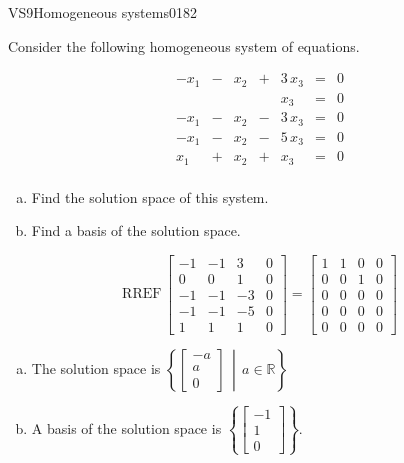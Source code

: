 \begin{exercise}{VS9}{Homogeneous systems}{0182} 
\begin{exerciseStatement} 

Consider the following homogeneous system of equations.

 \[\begin{matrix}
 -x_{1} &  -  & x_{2} &  +  & 3 \, x_{3} & = & 0 \\
 &  &  &  & x_{3} & = & 0 \\
 -x_{1} &  -  & x_{2} &  -  & 3 \, x_{3} & = & 0 \\
 -x_{1} &  -  & x_{2} &  -  & 5 \, x_{3} & = & 0 \\
 x_{1} &  +  & x_{2} &  +  & x_{3} & = & 0 \\
 \end{matrix}\] 

\begin{enumerate}[(a)]
\item  Find the solution space of this system.
\item  Find a basis of the solution space.
\end{enumerate}

     \end{exerciseStatement}
 \begin{exerciseAnswer} 

\[\mathrm{RREF}\,\left[\begin{array}{ccc|c}
-1 & -1 & 3 & 0 \\
0 & 0 & 1 & 0 \\
-1 & -1 & -3 & 0 \\
-1 & -1 & -5 & 0 \\
1 & 1 & 1 & 0
\end{array}\right]=\left[\begin{array}{ccc|c}
1 & 1 & 0 & 0 \\
0 & 0 & 1 & 0 \\
0 & 0 & 0 & 0 \\
0 & 0 & 0 & 0 \\
0 & 0 & 0 & 0
\end{array}\right]\]

 

\begin{enumerate}[(a)]
\item The solution space is \( \left\{ \left[\begin{array}{c}
-a \\
a \\
0
\end{array}\right] \,\middle|\, a \in\mathbb R \right\} \) 
\item A basis of the solution space is \(\left\{ \left[\begin{array}{c}
-1 \\
1 \\
0
\end{array}\right] \right\}\).
\end{enumerate}

     \end{exerciseAnswer}
 \end{exercise}


